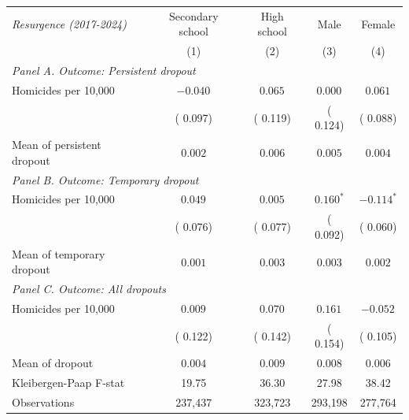 \begin{tabular}{l c c c c}
\hline\hline
{\small \textit{Resurgence (2017-2024)}} & Secondary school & High school & Male & Female \\
 & (1) & (2) & (3) & (4) \\
\hline
\multicolumn{5}{l}{{\small \textit{Panel A. Outcome: Persistent dropout}}} \\
Homicides per 10,000
 & $-0.040^{}$ & $ 0.065^{}$ & $ 0.000^{}$ & $ 0.061^{}$ \\
 & ( 0.097) & ( 0.119) & ( 0.124) & ( 0.088) \\
Mean of persistent dropout
 & $ 0.002$ & $ 0.006$ & $ 0.005$ & $ 0.004$ \\
\hline
\multicolumn{5}{l}{{\small \textit{Panel B. Outcome: Temporary dropout}}} \\
Homicides per 10,000
 & $ 0.049^{}$ & $ 0.005^{}$ & $ 0.160^{*}$ & $-0.114^{*}$ \\
 & ( 0.076) & ( 0.077) & ( 0.092) & ( 0.060) \\
Mean of temporary dropout
 & $ 0.001$ & $ 0.003$ & $ 0.003$ & $ 0.002$ \\
\hline
\multicolumn{5}{l}{{\small \textit{Panel C. Outcome: All dropouts}}} \\
Homicides per 10,000
 & $ 0.009^{}$ & $ 0.070^{}$ & $ 0.161^{}$ & $-0.052^{}$ \\
 & ( 0.122) & ( 0.142) & ( 0.154) & ( 0.105) \\
Mean of dropout
 & $ 0.004$ & $ 0.009$ & $ 0.008$ & $ 0.006$ \\
\hline
Kleibergen-Paap F-stat
 &  19.75 &  36.30 &  27.98 &  38.42 \\
\hline
Observations
 &   237,437 &   323,723 &   293,198 &   277,764 \\
\hline\hline
\end{tabular}
